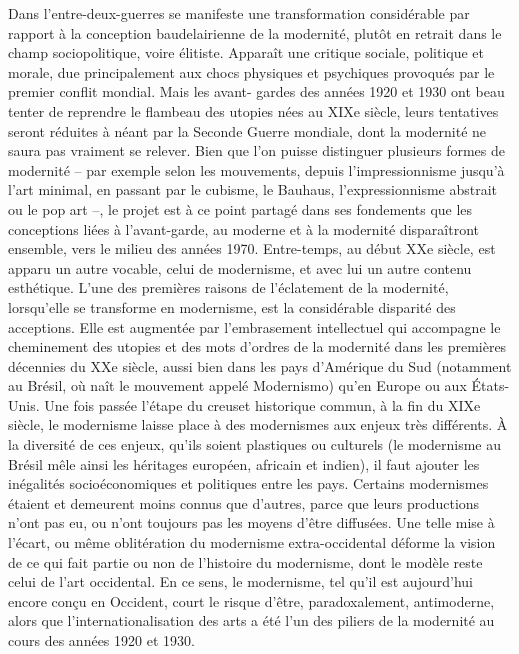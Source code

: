 Dans l'entre-deux-guerres se manifeste une transformation considérable par rapport à la conception baudelairienne de la modernité, plutôt en retrait dans le champ sociopolitique, voire élitiste. Apparaît une critique sociale, politique et morale, due principalement aux chocs physiques et psychiques provoqués par le premier conflit mondial. Mais les avant- gardes des années 1920 et 1930 ont beau tenter de reprendre le flambeau des utopies nées au XIXe siècle, leurs tentatives seront réduites à néant par la Seconde Guerre mondiale, dont la modernité ne saura pas vraiment se relever.
Bien que l'on puisse distinguer plusieurs formes de modernité – par exemple selon les mouvements, depuis l'impressionnisme jusqu'à l'art minimal, en passant par le cubisme, le Bauhaus, l'expressionnisme abstrait ou le pop art –, le projet est à ce point partagé dans ses fondements que les conceptions liées à l'avant-garde, au moderne et à la modernité disparaîtront ensemble, vers le milieu des années 1970. Entre-temps, au début XXe siècle, est apparu un autre vocable, celui de modernisme, et avec lui un autre contenu esthétique.
L'une des premières raisons de l'éclatement de la modernité, lorsqu'elle se transforme en modernisme, est la considérable disparité des acceptions. Elle est augmentée par
l'embrasement intellectuel qui accompagne le cheminement des utopies et des mots d'ordres de la modernité dans les premières décennies du XXe siècle, aussi bien dans les pays d'Amérique du Sud (notamment au Brésil, où naît le mouvement appelé Modernismo) qu'en
Europe ou aux États-Unis. Une fois passée l'étape du creuset historique commun, à la fin du XIXe siècle, le modernisme laisse place à des modernismes aux enjeux très différents.
À la diversité de ces enjeux, qu'ils soient plastiques ou culturels (le modernisme au Brésil mêle ainsi les héritages européen, africain et indien), il faut ajouter les inégalités socioéconomiques et politiques entre les pays. Certains modernismes étaient et demeurent moins connus que d'autres, parce que leurs productions n'ont pas eu, ou n'ont toujours pas les moyens d'être diffusées. Une telle mise à l'écart, ou même oblitération du modernisme extra-occidental déforme la vision de ce qui fait partie ou non de l'histoire du modernisme, dont le modèle reste celui de l'art occidental. En ce sens, le modernisme, tel qu'il est aujourd'hui encore conçu en Occident, court le risque d'être, paradoxalement, antimoderne, alors que l'internationalisation des arts a été l'un des piliers de la modernité au cours des années 1920 et 1930.
 
